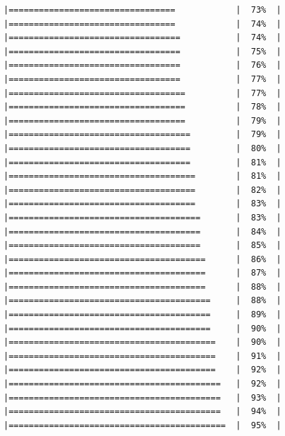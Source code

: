 \documentclass[
  krantz2]{krantz}
\begin{document}
\begin{verbatim}
|=================================            |  73%  |                                                     |=================================            |  74%  |                                                     |==================================           |  74%  |                                                     |==================================           |  75%  |                                                     |==================================           |  76%  |                                                     |==================================           |  77%  |                                                     |===================================          |  77%  |                                                     |===================================          |  78%  |                                                     |===================================          |  79%  |                                                     |====================================         |  79%  |                                                     |====================================         |  80%  |                                                     |====================================         |  81%  |                                                     |=====================================        |  81%  |                                                     |=====================================        |  82%  |                                                     |=====================================        |  83%  |                                                     |======================================       |  83%  |                                                     |======================================       |  84%  |                                                     |======================================       |  85%  |                                                     |=======================================      |  86%  |                                                     |=======================================      |  87%  |                                                     |=======================================      |  88%  |                                                     |========================================     |  88%  |                                                     |========================================     |  89%  |                                                     |========================================     |  90%  |                                                     |=========================================    |  90%  |                                                     |=========================================    |  91%  |                                                     |=========================================    |  92%  |                                                     |==========================================   |  92%  |                                                     |==========================================   |  93%  |                                                     |==========================================   |  94%  |                                                     |===========================================  |  95%  |                        
\end{verbatim}
\end{document}
